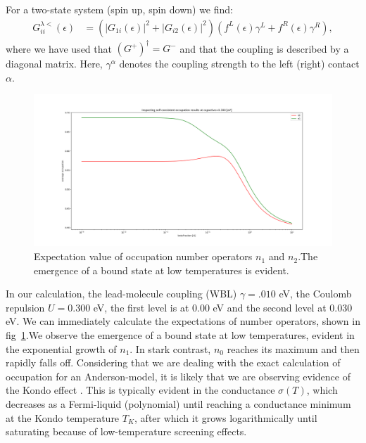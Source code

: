 \documentclass{article}
\begin{document}
\begin{multicols}{2}
        For a two-state system (spin up, spin down) we find:
        \begin{align*}
            G^{\lambda<}_{ii}(\epsilon) &= \left(\left|G_{1i}(\epsilon)\right|^2 + \left|G_{i2}(\epsilon)\right|^2 \right)\left(f^L (\epsilon) \gamma^L+f^R (\epsilon) \gamma^R\right),
        \end{align*}
        where we have used that $(G^+)^\dagger=G^-$ and that the coupling is described by a diagonal matrix. Here, $\gamma^\alpha$ denotes the coupling strength to the left (right) contact $\alpha$.
        
        \begin{figure}[b]
            \centering
            \includegraphics[width=\textwidth]{fig/figure_1.png}
            \caption{\label{fig:numberoperators}Expectation value of occupation number operators $n_1$ and $n_2$.The emergence of a bound state at low temperatures is evident.}
        \end{figure}
         
        
        In our calculation, the lead-molecule coupling (WBL) $\gamma=.010$ eV, the Coulomb repulsion $U=0.300$ eV, the first level is at $0.00$ eV and the second level at $0.030$ eV. We can immediately calculate the expectations of number operators, shown in fig~\ref{fig:numberoperators}.We observe the emergence of a bound state at low temperatures, evident in the exponential growth of $n_1$. In stark contrast, $n_0$ reaches its maximum and then rapidly falls off. Considering that we are dealing with the exact calculation of occupation for an Anderson-model, it is likely that we are observing evidence of the Kondo effect \cite{josherrereview}. This is typically evident in the conductance $\sigma(T)$, which decreases as a Fermi-liquid (polynomial) until reaching a conductance minimum at the Kondo temperature $T_K$, after which it grows logarithmically until saturating because of low-temperature screening effects.
        

\end{multicols}
\end{document}
